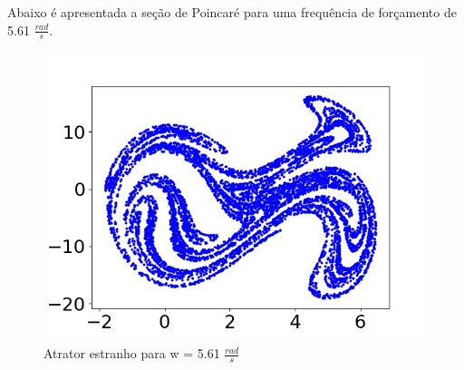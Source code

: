 
Abaixo é apresentada a seção de Poincaré para uma frequência de forçamento de 5.61 $\frac{rad}{s}$. 


\begin{figure}[!ht]
	\centering
	\includegraphics[scale=0.5]{poincare_section/poin_orb.jpg}
	\caption{Atrator estranho para w = 5.61 $\frac{rad}{s}$}
	\label{poincare_section5.51rad/s}
\end{figure}